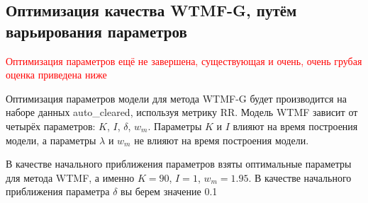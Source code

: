 \subsection{Оптимизация качества WTMF-G, путём варьирования параметров}
    \textcolor{red}{Оптимизация параметров ещё не завершена, существующая и очень, очень грубая оценка приведена ниже}

    Оптимизация параметров модели для метода WTMF-G будет производится на наборе данных auto\_cleared, используя метрику RR.
    Модель WTMF зависит от четырёх параметров: $K$, $I$, $\delta$, $w_m$.
    Параметры $K$ и $I$ влияют на время построения модели, а параметры $\lambda$ и $w_m$ не влияют на время построения модели.

    В качестве начального приближения параметров взяты оптимальные параметры для метода WTMF, а именно $K=90$, $I=1$, $w_m=1.95$.
    В качестве начального приближения параметра $\delta$ вы берем значение 0.1

